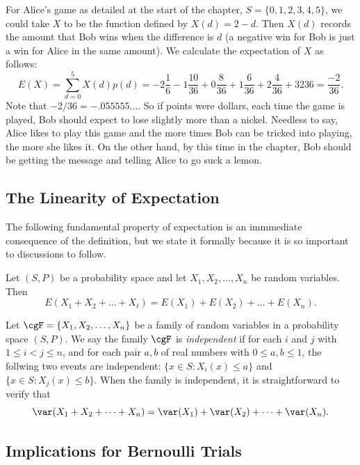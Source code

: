 \begin{example}
For Alice's game as detailed at the start of the chapter,
$S=\{0,1,2,3,4,5\}$, we could take $X$ to be the function defined by
$X(d)= 2-d$.  Then $X(d)$ records the amount that Bob wins when
the difference is $d$ (a negative win for Bob is just a win for Alice
in the same amount).  We calculate the expectation of $X$ as follows:
\[
E(X)=\sum_{d=0}^{5}X(d)p(d)= -2\frac{1}{6} -1\frac{10}{36}+0
     \frac{8}{36}+1\frac{6}{36}+2\frac{4}{36}+3{2}{36}=\frac{-2}{36}.
\]
Note that $-2/36=-.055555\dots$.  So if points were dollars, each
time the game is played, Bob should expect to lose slightly more
than a nickel.  Needless to say, Alice likes to play this game and
the more times Bob can be tricked into playing, the more she likes it.
On the other hand, by this time in the chapter, Bob should be getting
the message and telling Alice to go suck a lemon.
\end{example}

\subsection{The Linearity of Expectation}

The following fundamental property of expectation is an immmediate 
consequence of the definition, but we state it formally because it 
is so important to discussions to follow.

\begin{proposition}\label{prop:linearexpect}
Let $(S,P)$ be a probability space and let $X_1,X_2,\dots,X_n$ be
random variables.  Then
\[
E(X_1+X_2+\dots+X_t)=E(X_1)+E(X_2)+\dots+E(X_n).
\]
\end{proposition}

Let $\cgF=\{X_1,X_2,\dots,X_n\}$ be a family of random variables
in a probability space $(S,P)$.  We say the family $\cgF$ is
\textit{independent} if for each $i$ and $j$ with 
$1\le i<j\le n$, and for each pair $a,b$ of real numbers with
$0\le a,b\le 1$, the follwing two events are independent:
$\{x\in S: X_i(x)\le a\}$ and $\{x\in S:X_j(x)\le b\}$.  When
the family is independent, it is straightforward to verify that
\[
\var(X_1+X_2+\dots+X_n)=\var(X_1)+\var(X_2)+\dots+\var(X_n).
\]

\subsection{Implications for Bernoulli Trials}

